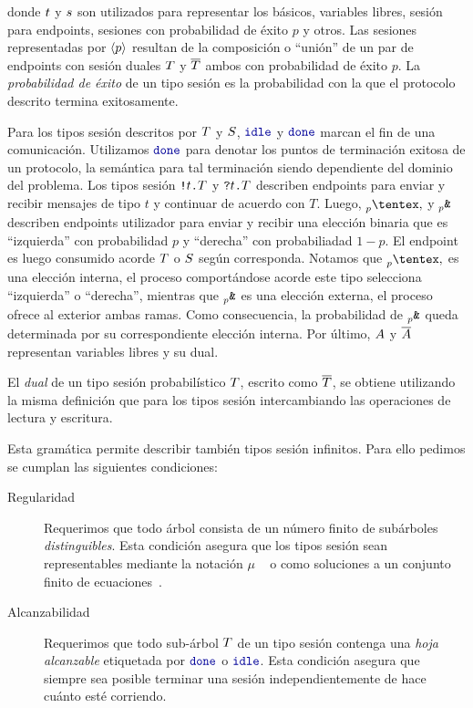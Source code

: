 donde $t$ y $s$ son utilizados para representar los  básicos,
variables libres, sesión para endpoints, sesiones con probabilidad de
éxito $p$ y otros. Las sesiones representadas por $\langle p \rangle$ resultan
de la composición o ``unión'' de un par de endpoints con sesión duales
$T$ y $\overline{T}$ ambos con probabilidad de éxito $p$. La
\emph{probabilidad de éxito} de un tipo sesión es la probabilidad con la que
el protocolo descrito termina exitosamente.

Para los tipos sesión descritos por $T$ y $S$, $\Idle$
y $\Done$ marcan el fin de una comunicación. Utilizamos $\Done$ para denotar
los puntos de terminación exitosa de un protocolo, la semántica para tal
terminación siendo dependiente del dominio del problema. Los tipos sesión
${\texttt{\upshape!}}{t}\texttt{\upshape.}T$ y ${\texttt{\upshape?}}{t}\texttt{\upshape.}T$ describen endpoints para
enviar y recibir mensajes de tipo $t$ y continuar de acuerdo con $T$. Luego,
$\PChoice$ y
$\PBranch$ describen endpoints utilizador para
enviar y recibir una elección binaria que es ``izquierda'' con probabilidad $p$
y ``derecha'' con probabiliadad $1 - p$. El endpoint es luego consumido acorde
$T$ o $S$ según corresponda. Notamos que $\PChoice{}{}$
es una elección interna, el proceso comportándose acorde este tipo selecciona
``izquierda'' o ``derecha'', mientras que $\PBranch$ es una elección
externa, el proceso ofrece al exterior ambas ramas. Como consecuencia, la
probabilidad de $\PBranch$ queda determinada por su correspondiente
elección interna. Por último, $A$ y $\overline{A}$ representan variables
libres y su dual.

El \emph{dual} de un tipo sesión probabilístico $T$, escrito como
$\overline{T}$, se obtiene utilizando la misma definición que para los
tipos sesión intercambiando las operaciones de lectura y escritura.

Esta gramática permite describir también tipos sesión infinitos. Para ello
pedimos se cumplan las siguientes condiciones:
\begin{description}

	\item[Regularidad] Requerimos que todo árbol consista de un número
		finito de subárboles \emph{distinguibles}. Esta condición
		asegura que los tipos sesión sean representables mediante la
		notación $\mu$ ~\cite{Pierce02} o como soluciones a un
		conjunto finito de ecuaciones~\cite{Courcelle83}.

	\item[Alcanzabilidad] Requerimos que todo sub-árbol $T$ de
		un tipo sesión contenga una \emph{hoja alcanzable} etiquetada
		por $\Done$ o $\Idle$. Esta condición asegura que siempre sea
		posible terminar una sesión independientemente de hace cuánto
		esté corriendo.
\end{description}
